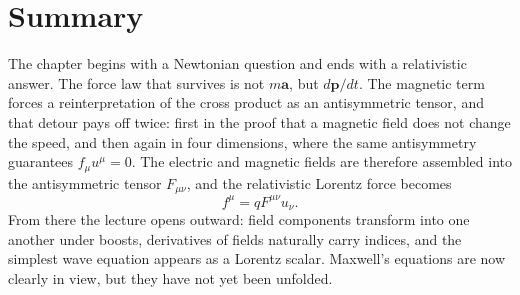 \section{Summary}

The chapter begins with a Newtonian question and ends with a relativistic answer. The force law that survives is not \(m\mathbf a\), but \(d\mathbf p/dt\). The magnetic term forces a reinterpretation of the cross product as an antisymmetric tensor, and that detour pays off twice: first in the proof that a magnetic field does not change the speed, and then again in four dimensions, where the same antisymmetry guarantees \(f_\mu u^\mu=0\). The electric and magnetic fields are therefore assembled into the antisymmetric tensor \(F_{\mu\nu}\), and the relativistic Lorentz force becomes
\begin{equation}
f^\mu = q F^{\mu\nu} u_\nu.
\end{equation}
From there the lecture opens outward: field components transform into one another under boosts, derivatives of fields naturally carry indices, and the simplest wave equation appears as a Lorentz scalar. Maxwell's equations are now clearly in view, but they have not yet been unfolded.